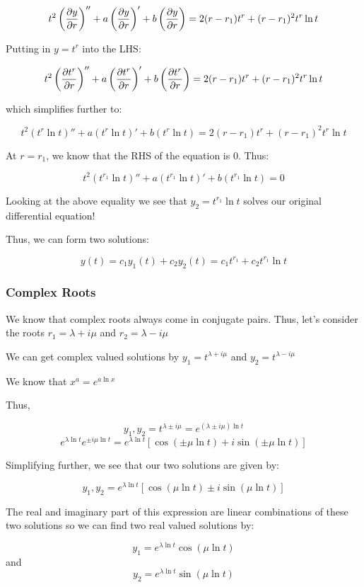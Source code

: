 \documentclass{report}
\begin{document}
$$t^2\left(\pdv{y}{r}\right)'' + a\left(\pdv{y}{r}\right)' + b\left(\pdv{y}{r}\right) = 2(r-r_1)t^r + (r-r_1)^2t^r\ln t$$

Putting in $y=t^r$ into the LHS:

$$t^2\left(\pdv{t^r}{r}\right)'' + a\left(\pdv{t^r}{r}\right)' + b\left(\pdv{t^r}{r}\right) = 2(r-r_1)t^r + (r-r_1)^2t^r\ln t$$

which simplifies further to:


$$t^2(t^r\ln t)'' + a(t^r\ln t)' + b(t^r\ln t) = 2(r-r_1)t^r + (r-r_1)^2t^r\ln t$$

At $r=r_1$, we know that the RHS of the equation is 0. Thus:


$$t^2(t^{r_1}\ln t)'' + a(t^{r_1}\ln t)' + b(t^{r_1}\ln t) = 0$$

Looking at the above equality we see that $y_2 = t^{r_1}\ln t$ solves our original differential equation!

Thus, we can form two solutions:

$$y(t) = c_1y_1(t) + c_2y_2(t) = c_1t^{r_1} + c_2t^{r_1}\ln t$$



\subsubsection{Complex Roots}
We know that complex roots always come in conjugate pairs. Thus, let's consider the roots $r_1 = \lambda + i\mu$ and $r_2 = \lambda - i\mu$

We can get complex valued solutions by $y_1 = t^{\lambda + i\mu}$ and $y_2 = t^{\lambda-i\mu}$

We know that $x^a = e^{a\ln{x}}$

Thus,

$$y_1, y_2 = t^{\lambda \pm i\mu} = e^{(\lambda \pm i\mu)\ln t}$$
$$e^{\lambda\ln t}e^{\pm i\mu \ln t} = e^{\lambda\ln t}[\cos(\pm \mu \ln t) + i\sin(\pm \mu \ln t)]$$

Simplifying further, we see that our two solutions are given by:

$$y_1, y_2 = e^{\lambda\ln t}[\cos(\mu \ln t) \pm i\sin( \mu \ln t)]$$

The real and imaginary part of this expression are linear combinations of these two solutions so we can find two real valued solutions by:

$$
y_1 = e^{\lambda\ln t}\cos(\mu \ln t)
$$
and
$$
y_2 = e^{\lambda\ln t}\sin(\mu \ln t)
$$
\end{document}
